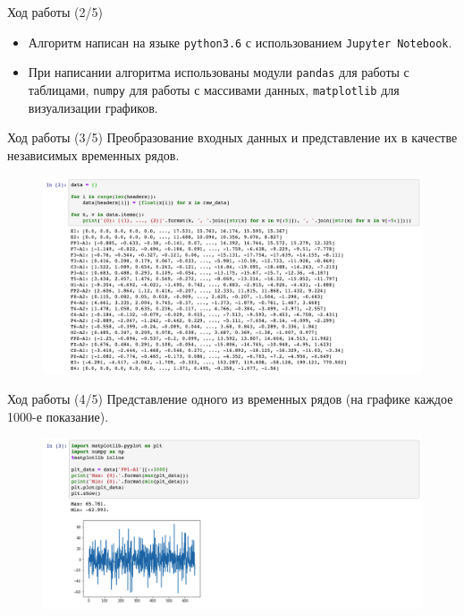\documentclass[aspectratio=169]{beamer}
\begin{document}
\begin{frame}{Ход работы (2/5)}
  \begin{itemize}
      \item {
        Алгоритм написан на языке \texttt{python3.6} с использованием \texttt{Jupyter Notebook}.
      }
      \item {
        При написании алгоритма использованы модули \texttt{pandas} для работы с таблицами, \texttt{numpy} для работы с массивами данных, \texttt{matplotlib} для визуализации графиков.
      }
  \end{itemize}
\end{frame}

\begin{frame}{Ход работы (3/5)}
  Преобразование входных данных и представление их в качестве независимых временных рядов.
  \begin{figure}[h!]
    \centering
    \includegraphics[scale=0.23]{2.png}
  \end{figure}
\end{frame}

\begin{frame}{Ход работы (4/5)}
  Представление одного из временных рядов (на графике каждое 1000-е показание).
  \begin{figure}[h!]
    \centering
    \includegraphics[scale=0.3]{3.png}
  \end{figure}
\end{frame}
\end{document}
